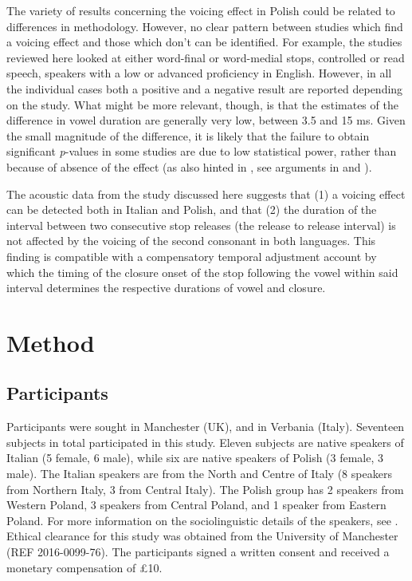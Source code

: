 \documentclass[charis]{glossa}
\begin{document}
The variety of results concerning the voicing effect in Polish could be
related to differences in methodology. However, no clear pattern between
studies which find a voicing effect and those which don't can be
identified. For example, the studies reviewed here looked at either
word-final or word-medial stops, controlled or read speech, speakers
with a low or advanced proficiency in English. However, in all the
individual cases both a positive and a negative result are reported
depending on the study. What might be more relevant, though, is that the
estimates of the difference in vowel duration are generally very low,
between 3.5 and 15 ms. Given the small magnitude of the difference, it
is likely that the failure to obtain significant \emph{p}-values in some
studies are due to low statistical power, rather than because of absence
of the effect (as also hinted in \citealt{begus2017}, see arguments in
\citealt{roettger2019} and \citealt{nicenboim2018a}).

The acoustic data from the study discussed here suggests that (1) a
voicing effect can be detected both in Italian and Polish, and that (2)
the duration of the interval between two consecutive stop releases (the
release to release interval) is not affected by the voicing of the
second consonant in both languages. This finding is compatible with a
compensatory temporal adjustment account by which the timing of the
closure onset of the stop following the vowel within said interval
determines the respective durations of vowel and closure.

\hypertarget{method}{%
\section{Method}\label{method}}

\label{s:method}

\hypertarget{participants}{%
\subsection{Participants}\label{participants}}

Participants were sought in Manchester (UK), and in Verbania (Italy).
Seventeen subjects in total participated in this study. Eleven subjects
are native speakers of Italian (5 female, 6 male), while six are native
speakers of Polish (3 female, 3 male). The Italian speakers are from the
North and Centre of Italy (8 speakers from Northern Italy, 3 from
Central Italy). The Polish group has 2 speakers from Western Poland, 3
speakers from Central Poland, and 1 speaker from Eastern Poland. For
more information on the sociolinguistic details of the speakers, see
. Ethical clearance for this study was obtained from
the University of Manchester (REF 2016-0099-76). The participants signed
a written consent and received a monetary compensation of £10.
\end{document}

